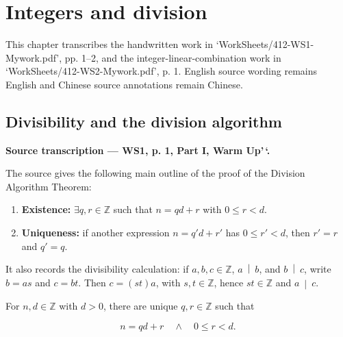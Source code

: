 \chapter{Integers and division}\label{integers-and-division}

This chapter transcribes the handwritten work in `WorkSheets/412-WS1-Mywork.pdf', pp. 1--2, and the integer-linear-combination work in `WorkSheets/412-WS2-Mywork.pdf', p. 1. English source wording remains English and Chinese source annotations remain Chinese.

\section{Divisibility and the division algorithm}

\textbf{Source transcription --- WS1, p. 1, Part I, Warm Up'\,`.}

The source gives the following main outline of the proof of the Division Algorithm Theorem:

\begin{enumerate}
\tightlist
\item
  \textbf{Existence:} \(\exists q,r \in \mathbb{Z}\) such that \(n = qd + r\) with \(0 \leq r < d\).
\item
  \textbf{Uniqueness:} if another expression \(n = q'd + r'\) has \(0 \leq r' < d\), then \(r' = r\) and \(q' = q\).
\end{enumerate}

It also records the divisibility calculation: if \(a,b,c \in \mathbb{Z}\), \(\left. a\  \middle| \ b \right.\), and \(\left. b\  \middle| \ c \right.\), write \(b = as\) and \(c = bt\). Then \(c = \left( {st} \right)a\), with \(s,t \in \mathbb{Z}\), hence \(st \in \mathbb{Z}\) and \(\left. a\  \middle| \ c \right.\).

\begin{theorem}{}

For \(n,d \in \mathbb{Z}\) with \(d > 0\), there are unique \(q,r \in \mathbb{Z}\) such that

\[n = qd + r\quad \land \quad 0 \leq r < d.\]

\end{theorem}

